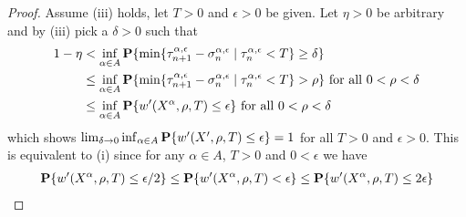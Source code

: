 \begin{proof}
Assume (iii) holds, let $T > 0$ and $\epsilon > 0$ be given.  Let $\eta>0$ be arbitrary and by (iii) pick a $\delta > 0$ such that
\begin{align*}
1 -\eta &< \inf_{\alpha \in A} \textbf{P}\{\min \lbrace \tau^{\alpha, \epsilon}_{n+1} - \sigma^{\alpha, \epsilon}_n \mid \tau^{\alpha, \epsilon}_n < T \rbrace \geq \delta\} \\
&\leq \inf_{\alpha \in A} \textbf{P}\{\min \lbrace \tau^{\alpha, \epsilon}_{n+1} - \sigma^{\alpha, \epsilon}_n \mid \tau^{\alpha, \epsilon}_n < T \rbrace > \rho\} \text{ for all $0 < \rho < \delta$} \\
&\leq \inf_{\alpha \in A} \textbf{P}\{w^{\prime}(X^\alpha, \rho, T)  \leq \epsilon\} \text{ for all $0 < \rho < \delta$} \\
\end{align*}
which shows $\lim_{\delta \to 0} \inf_{\alpha \in A} \textbf{P}\{w^{\prime}(X^\prime, \rho, T)  \leq \epsilon\} = 1$ for all $T > 0$ and $\epsilon > 0$.  This is equivalent to (i) since for any $\alpha \in A$, $T > 0$ and $0 < \epsilon$ we have 
\begin{align*}
\textbf{P}\{w^{\prime}(X^\alpha, \rho, T)  \leq \epsilon/2\} \leq \textbf{P}\{w^{\prime}(X^\alpha, \rho, T)  < \epsilon\} \leq \textbf{P}\{w^{\prime}(X^\alpha, \rho, T)  \leq 2\epsilon\}
\end{align*}
\end{proof}


